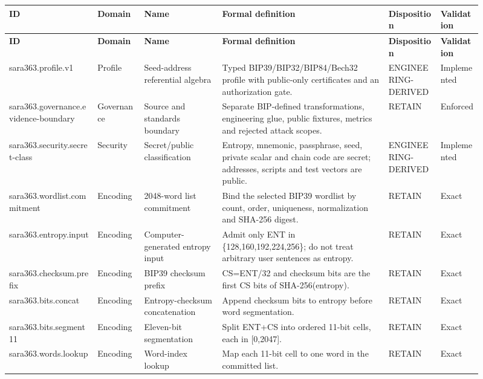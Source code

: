 \setlength{\tabcolsep}{3pt}\begin{longtable}{@{}p{0.17\linewidth} p{0.09\linewidth} p{0.15\linewidth} p{0.32\linewidth} p{0.10\linewidth} p{0.08\linewidth}@{}}
\toprule
\textbf{ID} & \textbf{Domain} & \textbf{Name} & \textbf{Formal definition} & \textbf{Disposition} & \textbf{Validation}\\
\midrule
\endfirsthead
\toprule
\textbf{ID} & \textbf{Domain} & \textbf{Name} & \textbf{Formal definition} & \textbf{Disposition} & \textbf{Validation}\\
\midrule
\endhead
sara363.profile.v1 & Profile & Seed-address referential algebra & Typed BIP39/BIP32/BIP84/Bech32 profile with public-only certificates and an authorization gate. & ENGINEERING-DERIVED & Implemented\\
\addlinespace[1.5pt]
sara363.governance.evidence-boundary & Governance & Source and standards boundary & Separate BIP-defined transformations, engineering glue, public fixtures, metrics and rejected attack scopes. & RETAIN & Enforced\\
\addlinespace[1.5pt]
sara363.security.secret-class & Security & Secret/public classification & Entropy, mnemonic, passphrase, seed, private scalar and chain code are secret; addresses, scripts and test vectors are public. & ENGINEERING-DERIVED & Implemented\\
\addlinespace[1.5pt]
sara363.wordlist.commitment & Encoding & 2048-word list commitment & Bind the selected BIP39 wordlist by count, order, uniqueness, normalization and SHA-256 digest. & RETAIN & Exact\\
\addlinespace[1.5pt]
sara363.entropy.input & Encoding & Computer-generated entropy input & Admit only ENT in \{128,160,192,224,256\}; do not treat arbitrary user sentences as entropy. & RETAIN & Exact\\
\addlinespace[1.5pt]
sara363.checksum.prefix & Encoding & BIP39 checksum prefix & CS=ENT/32 and checksum bits are the first CS bits of SHA-256(entropy). & RETAIN & Exact\\
\addlinespace[1.5pt]
sara363.bits.concat & Encoding & Entropy-checksum concatenation & Append checksum bits to entropy before word segmentation. & RETAIN & Exact\\
\addlinespace[1.5pt]
sara363.bits.segment11 & Encoding & Eleven-bit segmentation & Split ENT+CS into ordered 11-bit cells, each in [0,2047]. & RETAIN & Exact\\
\addlinespace[1.5pt]
sara363.words.lookup & Encoding & Word-index lookup & Map each 11-bit cell to one word in the committed list. & RETAIN & Exact\\

\end{longtable}
